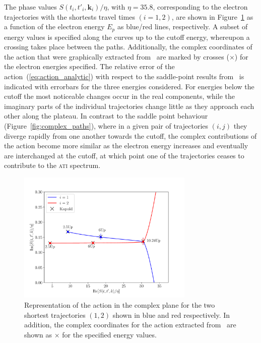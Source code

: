 The phase values $S(t_{i},t'_{i},\mathbf{k}_{i})/\eta$, with $\eta =
35.8$, corresponding to the electron trajectories with the shortests
travel times $(i = 1, 2)$, are shown in Figure~\ref{fig:phase_ReIm} as
a function of the electron energy $E_{p}$ as blue/red lines,
respectively. A subset of energy values is specified along the curves
up to the cutoff energy, whereupon a crossing takes place between the
paths. Additionally, the complex coordinates of the action that were
graphically extracted from~\cite{phd_Kopold} are marked by crosses
($\times$) for the electron energies specified. The relative error of
the action~(\ref{eq:action_analytic}) with respect to the saddle-point
results from~\cite{phd_Kopold} is indicated with errorbars for the
three energies considered. For energies below the cutoff the most
noticeable changes occur in the real components, while the imaginary
parts of the individual trajectories change little as they approach
each other along the plateau. In contrast to the saddle point
behaviour (Figure~\ref{fig:complex_paths}), where in a given pair of
trajectories $(i, j)$ they diverge rapidly from one another towards
the cutoff, the complex contributions of the action become more
similar as the electron energy increases and eventually are
interchanged at the cutoff, at which point one of the trajectories
ceases to contribute to the \textsc{ati} spectrum.

\begin{figure}
  \centering \includegraphics[width =
    0.75\textwidth]{figures/ch_ATI_SPA/rescattering/phase_ComplexReIm.pdf}
  \caption{Representation of the action in the complex plane for the
    two shortest trajectories $(1, 2)$ shown in blue and red
    respectively. In addition, the complex coordinates for the action
    extracted from~\cite{phd_Kopold} are shown as $\times$ for the
    specified energy values.}
  \label{fig:phase_ReIm}
\end{figure}

